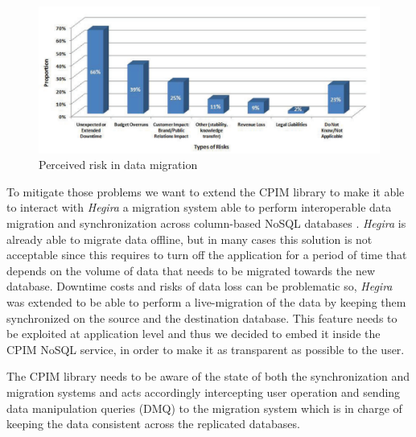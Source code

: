 \begin{figure}[tbh]
  \centering
  \includegraphics[width=13cm]{images/hitachi_survey}
  \caption{Perceived risk in data migration \cite{paper:hitachi} }
  \label{fig:cpim-nosql}
\end{figure}

\newparagraph To mitigate those problems we want to extend the CPIM library to make it able to interact with \textit{Hegira} a migration system able to perform interoperable data migration and synchronization across column-based NoSQL databases \cite{paper:modaclouds-deliverable}. \textit{Hegira} is already able to migrate data offline, but in many cases this solution is not acceptable since this requires to turn off the application for a period of time that depends on the volume of data that needs to be migrated towards the new database. 
Downtime costs and risks of data loss can be problematic so, \textit{Hegira} was extended to be able to perform a live-migration of the data by keeping them synchronized on the source and the destination database.
This feature needs to be exploited at application level and thus we decided to embed it inside the CPIM NoSQL service, in order to make it as transparent as possible to the user.

\noindent The CPIM library needs to be aware of the state of both the synchronization and migration systems and acts accordingly intercepting user operation and sending data manipulation queries (DMQ) to the migration system which is in charge of keeping the data consistent across the replicated databases.